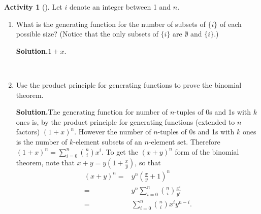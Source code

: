 \documentclass[10pt,]{book}
\theoremstyle{plain}
\theoremstyle{definition}
\newtheorem{activity}[project]{Activity}
\numberwithin{equation}{chapter}
\newcommand{\amp}{&}
\begin{document}
\begin{activity}[]\label{activity-165}
Let \(i\) denote an integer between 1 and \(n\).%
~\par
\begin{enumerate}[label=(\alph*)]
 \item What is the generating function for the number of subsets of \(\{i\}\) of each possible size? (Notice that the only subsets of \(\{i\}\) are \(\emptyset\) and \(\{i\}\).)%
\par\medskip\noindent%
\textbf{Solution.}\quad \(1+x\).%

~\par
\item Use the product principle for generating functions to prove the binomial theorem.%
\par\medskip\noindent%
\textbf{Solution.}\quad The generating function for number of \(n\)-tuples of 0s and 1s with \(k\) ones is, by the product principle for generating functions (extended to \(n\) factors) \((1+x)^n\). However the number of \(n\)-tuples of 0s and 1s with \(k\) ones is the number of \(k\)-element subsets of an \(n\)-element set. Therefore \((1+x)^n =\sum_{i=0}^n \binom{n}{i}x^i\). To get the \((x+y)^n\) form of the binomial theorem, note that \(x+y = y(1+\frac{x}{y})\), so that%
\begin{align*}
(x+y)^n  =\amp  y^n\left(\frac{x}{y}+1\right)^n\\
=\amp y^n\sum_{i=0}^n \binom{n}{i}\frac{x^i}{y^i}\\
=\amp  \sum_{i=0}^n\binom{n}{i}x^iy^{n-i}.
\end{align*}
%

\end{enumerate}
\end{activity}
\typeout{************************************************}
\typeout{************************************************}
\end{document}
